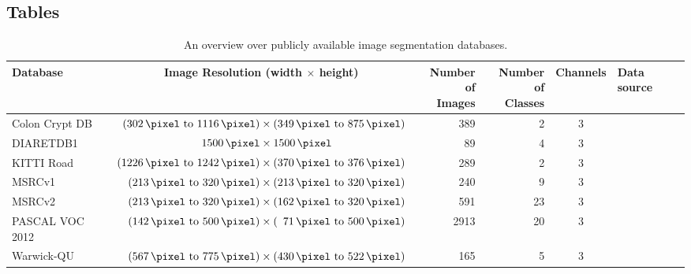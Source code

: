 
\clearpage\onecolumn
\begin{appendices}
\section{Tables}
\begin{table}[ht]
    \centering
    \begin{tabular}{lcrrcl}
    \toprule
    Database        & Image Resolution (width $\times$ height) & \parbox{1cm}{\centering Number of\\Images}  & \parbox{1cm}{\centering Number of\\Classes}  & Channels & Data source\\\midrule
    Colon Crypt DB  & $\hphantom{0}(\SIrange{302}{1116}{\pixel}) \times (\SIrange{349}{875}{\pixel})$            & \num{389}  &  2 & 3        & \cite{colon-crypt-segmentation-db}\\
    DIARETDB1       & $\hphantom{00}\SI{1500}{\pixel} \times \SI{1500}{\pixel}$                                   &  \num{89}  &  4 & 3        & \cite{kalesnykiene2014diaretdb1}\\
    KITTI Road      & $(\SIrange{1226}{1242}{\pixel}) \times (\SIrange{370}{376}{\pixel})$           & \num{289}  &  2 & 3        & \cite{Fritsch2013ITSC}\\
    MSRCv1          & $\hphantom{00}(\SIrange{213}{320}{\pixel}) \times (\SIrange{213}{320}{\pixel})$             &  \num{240} &  9 & 3        & \cite{MSRC-data}\\
    MSRCv2          & $\hphantom{00}(\SIrange{213}{320}{\pixel}) \times (\SIrange{162}{320}{\pixel})$             & \num{591}  & 23 & 3        & \cite{MSRC-data}\\
    PASCAL VOC 2012 & $\hphantom{00}(\SIrange{142}{500}{\pixel}) \times (\hphantom{0}\SIrange{71}{500}{\pixel})$  & \num{2913} & 20 & 3        & \cite{pascal-voc-2012-data}  \\
    Warwick-QU      & $\hphantom{00}(\SIrange{567}{775}{\pixel}) \times (\SIrange{430}{522}{\pixel})$             & \num{165}  &  5 & 3        & \cite{coelho2009nuclear}\\
    \bottomrule
    \end{tabular}
    \caption{An overview over publicly available image segmentation databases.}
    \label{table:segmentation-databases}
\end{table}
\end{appendices}
